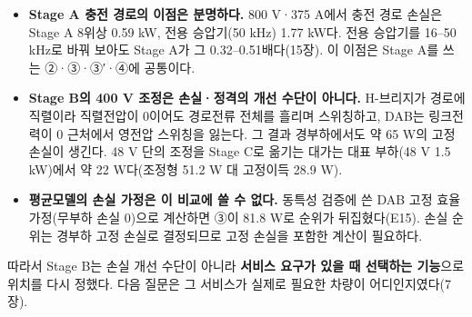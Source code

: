 \begin{itemize}
\item \textbf{Stage A 충전 경로의 이점은 분명하다.} 800 V·375 A에서 충전 경로 손실은 Stage A 8위상 0.59 kW, 전용 승압기(50 kHz) 1.77 kW다. 전용 승압기를 16–50 kHz로 바꿔 보아도 Stage A가 그 0.32–0.51배다(15장). 이 이점은 Stage A를 쓰는 ②·③·③′·④에 공통이다.
\item \textbf{Stage B의 400 V 조정은 손실·정격의 개선 수단이 아니다.} H-브리지가 경로에 직렬이라 직렬전압이 0이어도 경로전류 전체를 흘리며 스위칭하고, DAB는 링크전력이 0 근처에서 영전압 스위칭을 잃는다. 그 결과 경부하에서도 약 65 W의 고정 손실이 생긴다. 48 V 단의 조정을 Stage C로 옮기는 대가는 대표 부하(48 V 1.5 kW)에서 약 22 W다(조정형 51.2 W 대 고정이득 28.9 W).
\item \textbf{평균모델의 손실 가정은 이 비교에 쓸 수 없다.} 동특성 검증에 쓴 DAB 고정 효율 가정(무부하 손실 0)으로 계산하면 ③이 81.8 W로 순위가 뒤집혔다(E15). 손실 순위는 경부하 고정 손실로 결정되므로 고정 손실을 포함한 계산이 필요하다.
\end{itemize}

따라서 Stage B는 손실 개선 수단이 아니라 \textbf{서비스 요구가 있을 때 선택하는 기능}으로 위치를 다시 정했다. 다음 질문은 그 서비스가 실제로 필요한 차량이 어디인지였다(7장).
